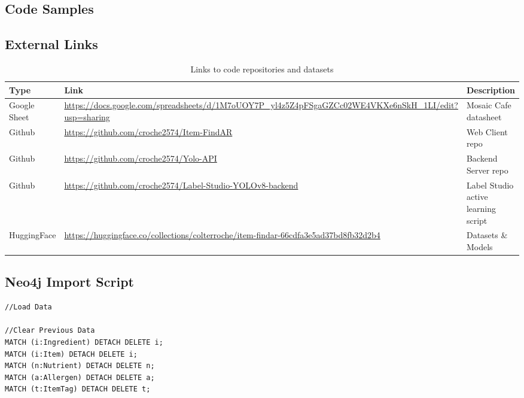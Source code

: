 \documentclass[thesis]{fputhesis}
\newcommand{\ra}[1]{\renewcommand{\arraystretch}{#1}}
\begin{document}
\begin{body}
\doublespacing
\begin{appendices}
\renewcommand{\appendixname}{APPENDIX}

\chapter{Code Samples}
\section{External Links}
\begin{table}[h]\centering
\caption{Links to code repositories and datasets}\label{tab:repos}
\ra{1.3}
    \begin{tabular}{@{}l p{} >{\raggedright\arraybackslash}p{}@{}}
        \toprule
            \textbf{Type}   &   \textbf{Link}   &   \textbf{Description}    \\
        \midrule
            Google Sheet    &   \url{https://docs.google.com/spreadsheets/d/1M7oUOY7P\_yl4z5Z4pFSgaGZCc02WE4VKXe6nSkH\_1LI/edit?usp=sharing}    &   Mosaic Cafe datasheet   \\
            Github          &   \url{https://github.com/croche2574/Item-FindAR} &   Web Client repo \\
            Github          &   \url{https://github.com/croche2574/Yolo-API}    &   Backend Server repo  \\ 
            Github          &   \url{https://github.com/croche2574/Label-Studio-YOLOv8-backend} & Label Studio active learning script   \\
            HuggingFace     &   \url{https://huggingface.co/collections/colterroche/item-findar-66cdfa3e5ad37bd8fb32d2b4}   &   Datasets \& Models  \\
        \bottomrule
    \end{tabular}%
\end{table}

\filbreak
\section{Neo4j Import Script}
\singlespacing
\begin{lstlisting}[language=Cypher]
//Load Data

//Clear Previous Data
MATCH (i:Ingredient) DETACH DELETE i;
MATCH (i:Item) DETACH DELETE i;
MATCH (n:Nutrient) DETACH DELETE n;
MATCH (a:Allergen) DETACH DELETE a;
MATCH (t:ItemTag) DETACH DELETE t;


\end{lstlisting}
\end{appendices}
\end{body}
\end{document}
